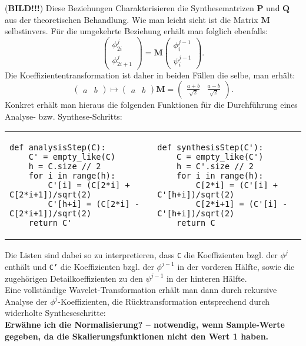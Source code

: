 %
(\textbf{BILD!!!}) Diese Beziehungen Charakterisieren die Synthesematrizen $\mathbf{P}$ und $\mathbf{Q}$ aus der theoretischen Behandlung. Wie man leicht sieht ist die Matrix $\mathbf{M}$ selbstinvers. Für die umgekehrte Beziehung erhält man folglich ebenfalls:
%
\[
\begin{pmatrix}
\phi_{2i}^{j} \\
\phi_{2i+1}^{j}
\end{pmatrix}
=
\mathbf{M}
\begin{pmatrix}
\phi_{i}^{j-1} \\
\psi_{i}^{j-1}
\end{pmatrix}
.
\]
%
Die Koeffiziententransformation ist daher in beiden Fällen die selbe, man erhält:
%
\[
\begin{pmatrix}
a & b
\end{pmatrix}
\mapsto
\begin{pmatrix}
a & b
\end{pmatrix}
\mathbf{M}
=
\begin{pmatrix}
\frac{a+b}{\sqrt{2}} & \frac{a-b}{\sqrt{2}}
\end{pmatrix}
.
\]
%
Konkret erhält man hieraus die folgenden Funktionen für die Durchführung eines Analyse- bzw. Synthese-Schritts:

\begin{adjustbox}{max width=\textwidth ,center}
\begin{tabular}{p{}|p{}}
\begin{verbatim}
def analysisStep(C):
    C' = empty_like(C)
    h = C.size // 2
    for i in range(h):
        C'[i] = (C[2*i] + C[2*i+1])/sqrt(2)
        C'[h+i] = (C[2*i] - C[2*i+1])/sqrt(2)
    return C'
\end{verbatim}
&
\begin{verbatim}
def synthesisStep(C'):
    C = empty_like(C')
    h = C'.size // 2
    for i in range(h):
        C[2*i] = (C'[i] + C'[h+i])/sqrt(2)
        C[2*i+1] = (C'[i] - C'[h+i])/sqrt(2)
    return C
\end{verbatim}
\\
\end{tabular}
\end{adjustbox}

\noindent Die Listen sind dabei so zu interpretieren, dass \texttt{C} die Koeffizienten bzgl. der $\phi^{j}$ enthält und \texttt{C'} die Koeffizienten bzgl. der $\phi^{j-1}$ in der vorderen Hälfte, sowie die zugehörigen Detailkoeffizienten zu den $\psi^{j-1}$ in der hinteren Hälfte.\\
Eine vollständige Wavelet-Transformation erhält man dann durch rekursive Analyse der $\phi^{j}$-Koeffizienten, die Rücktransformation entsprechend durch widerholte Syntheseschritte:
\\
\textbf{Erwähne ich die Normalisierung? -- notwendig, wenn Sample-Werte gegeben, da die Skalierungsfunktionen nicht den Wert 1 haben.}

